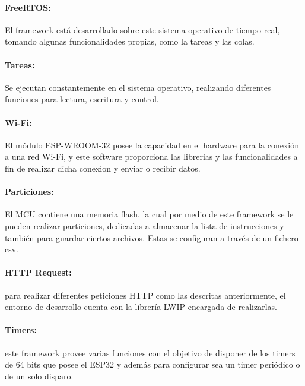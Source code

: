 \paragraph{FreeRTOS:}El framework está desarrollado sobre este sistema operativo de tiempo real, tomando algunas funcionalidades propias, como la tareas y las colas.

\paragraph{Tareas:}Se ejecutan constantemente en el sistema operativo, realizando diferentes funciones para lectura, escritura y control.

\paragraph{Wi-Fi:}El módulo ESP-WROOM-32 posee la capacidad en el hardware para la conexión a una red Wi-Fi, y este software proporciona las librerias y las funcionalidades a fin de realizar dicha conexion y enviar o recibir datos.

\paragraph{Particiones:}El MCU contiene una memoria flash, la cual por medio de este framework se le pueden realizar particiones, dedicadas a almacenar la lista de instrucciones y también para guardar ciertos archivos. Estas se configuran a través de un fichero csv.


\paragraph{HTTP Request:}para realizar diferentes peticiones HTTP como las descritas anteriormente, el entorno de desarrollo cuenta con la librería LWIP encargada de realizarlas.

\paragraph{Timers:}este framework provee varias funciones con el objetivo de disponer de los timers de 64 bits que posee el ESP32 y además para configurar sea un timer periódico o de un solo disparo.

